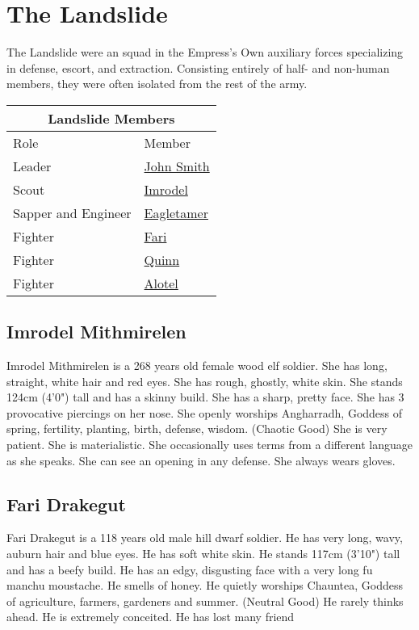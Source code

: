\section{The Landslide}

The Landslide were an squad in the Empress's Own auxiliary forces specializing in defense, escort,
  and extraction.
Consisting entirely of half- and non-human members, they were often isolated from the rest of the
  army.

\bigskip
\begin{center}
  \begin{tabular}{|l|l|}
    \hline
    \multicolumn{2}{|c|}{Landslide Members}\\
    \hline
    Role & Member \\
    \hline
    Leader & \hyperref[sec:beez]{John Smith} \\
    Scout & \hyperref[subsec:imrodel]{Imrodel} \\
    Sapper and Engineer & \hyperref[subsec:eagletamer]{Eagletamer} \\
    Fighter & \hyperref[subsec:fari]{Fari} \\
    Fighter & \hyperref[subsec:quinn]{Quinn} \\
    Fighter & \hyperref[subsec:alotel]{Alotel} \\
    \hline
  \end{tabular}
\end{center}


\subsection{Imrodel Mithmirelen}\label{subsec:imrodel}
Imrodel Mithmirelen is a 268 years old female wood elf soldier.
She has long, straight, white hair and red eyes.
She has rough, ghostly, white skin.
She stands 124cm (4'0") tall and has a skinny build.
She has a sharp, pretty face.
She has 3 provocative piercings on her nose.
She openly worships Angharradh, Goddess of spring, fertility, planting, birth, defense, wisdom. (Chaotic Good)
She is very patient.
She is materialistic.
She occasionally uses terms from a different language as she speaks.
She can see an opening in any defense.
She always wears gloves.

\subsection{Fari Drakegut}\label{subsec:fari}
Fari Drakegut is a 118 years old male hill dwarf soldier.
He has very long, wavy, auburn hair and blue eyes.
He has soft white skin.
He stands 117cm (3'10") tall and has a beefy build.
He has an edgy, disgusting face with a very long fu manchu moustache.
He smells of honey.
He quietly worships Chauntea, Goddess of agriculture, farmers, gardeners and summer. (Neutral Good)
He rarely thinks ahead.
He is extremely conceited.
He has lost many friend

